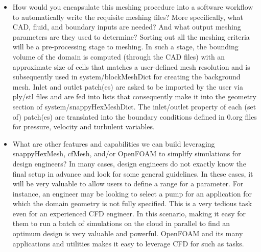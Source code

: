 \documentclass[10pt,letterpaper]{article}
\newcommand{\mfont}[1]{{\fontfamily{qcr}\selectfont #1}}
\begin{document}
\begin{itemize}
	\item How would you encapsulate this meshing procedure into a software workflow to
	automatically write the requisite meshing files? More specifically, what CAD, fluid, and
	boundary inputs are needed? And what output meshing parameters are they used to
	determine?
	{
		\color{mblue}
		Sorting out all the meshing criteria will be a pre-processing stage to meshing. In such a stage, the bounding volume of the domain is computed (through the CAD files) with an approximate size of cells that matches a user-defined mesh resolution and is subsequently used in \mfont{system\slash blockMeshDict} for creating the background mesh.  Inlet and outlet patch(es) are asked to be imported by the user via ply/stl files and are fed into lists that consequently make it into the \mfont{geometry} section of \mfont{system\slash snappyHexMeshDict}. The inlet/outlet property of each (set of) patch(es) are translated into the boundary conditions defined in \mfont{0.org} files for pressure, velocity and turbulent variables.
	}
	\item What are other features and capabilities we can build leveraging snappyHexMesh,
	cfMesh, and/or OpenFOAM to simplify simulations for design engineers?
		{
		\color{mblue}
		In many cases, design engineers do not exactly know the final setup in advance and look for some general guidelines. In these cases, it will be very valuable to allow users to define a range for a parameter. For instance, an engineer may be looking to select a pump for an application for which the domain geometry is not fully specified. This is a very tedious task even for an experienced CFD engineer. In this scenario, making it easy for them to run a batch of simulations on the cloud in parallel to find an optimum design is very valuable and powerful. OpenFOAM and its many applications and utilities makes it easy to leverage CFD for such as tasks. 
		}
	
\end{itemize}
	
\end{document}
